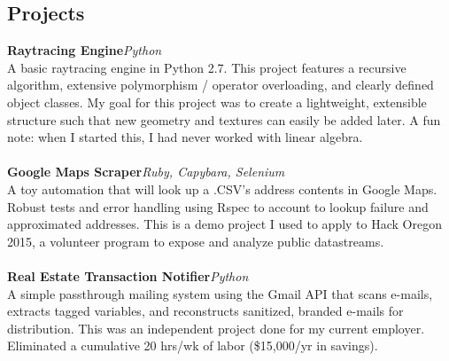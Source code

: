 \documentclass[11pt,line,centered]{res}
\begin{document}
\begin{resume}
\section{\sectionfont\normalsize Projects}
    \vspace{1em}
    {\bfseries\footnotesize Raytracing Engine}\hfill \textit {Python}\\
        A basic raytracing engine in Python 2.7. This project features a recursive algorithm, extensive polymorphism
        / operator overloading, and clearly defined object classes. My goal for this project was to create a lightweight,
        extensible structure such that new geometry and textures can easily be added later. A fun note: when I
        started this, I had never worked with linear algebra.\\
    \\
    {\bfseries\footnotesize  Google Maps Scraper}\hfill \textit {Ruby, Capybara, Selenium}\\
        A toy automation that will look up a .CSV’s address contents in Google Maps. Robust tests and error
        handling using Rspec to account to lookup failure and approximated addresses. This is a demo project I
        used to apply to Hack Oregon 2015, a volunteer program to expose and analyze public datastreams.\\
    \\
    {\bfseries\footnotesize  Real Estate Transaction Notifier}\hfill \textit {Python}\\
        A simple passthrough mailing system using the Gmail API that scans e-mails, extracts tagged variables,
        and reconstructs sanitized, branded e-mails for distribution. This was an independent project done for my
        current employer. Eliminated a cumulative 20 hrs/wk of labor (\$15,000/yr in savings).\\


\end{resume}
\end{document}
